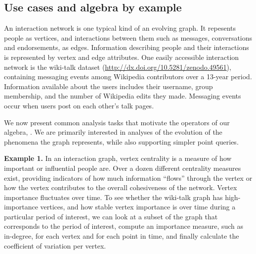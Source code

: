\subsection{Use cases and algebra by example}
\label{sec:cases}

An interaction network is one typical kind of an evolving graph.  It
repesents people as vertices, and interactions between them such as
messages, conversations and endorsements, as edges.  Information
describing people and their interactions is represented by vertex and
edge attributes.  One easily accessible interaction network is the
wiki-talk dataset (\url{http://dx.doi.org/10.5281/zenodo.49561}),
containing messaging events among Wikipedia contributors over a
13-year period.  Information available about the users includes their
username, group membership, and the number of Wikipedia edits they
made.  Messaging events occur when users post on each other's talk
pages.

We now present common analysis tasks that motivate the operators of
our algebra, \tga.  We are primarily interested in analyses of the
evolution of the phenomena the graph represents, while also supporting
simpler point queries.

{\bf Example 1.}  In an interaction graph, vertex centrality is a
measure of how important or influential people are.  Over a dozen
different centrality measures exist, providing indicators of how much
information ``flows'' through the vertex or how the vertex contributes
to the overall cohesiveness of the network.  Vertex importance
fluctuates over time.  To see whether the wiki-talk graph has
high-importance vertices, and how stable vertex importance is over
time during a particular period of interest, we can look at a subset
of the graph that corresponds to the period of interest, compute an
importance measure, such as in-degree, for each vertex and for each
point in time, and finally calculate the coefficient of variation per
vertex.


